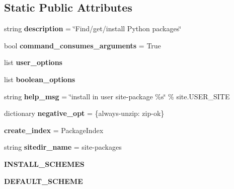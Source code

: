 \subsection*{Static Public Attributes}
\begin{DoxyCompactItemize}
\item 
\mbox{\label{classsetuptools_1_1command_1_1easy__install_1_1easy__install_a7413a87befc860cbf36d8b1bbd7270bc}} 
string {\bfseries description} = \char`\"{}Find/get/install Python packages\char`\"{}
\item 
\mbox{\label{classsetuptools_1_1command_1_1easy__install_1_1easy__install_a6c9ccc5d06b5291e3d6268b74fe33f14}} 
bool {\bfseries command\+\_\+consumes\+\_\+arguments} = True
\item 
\mbox{\label{classsetuptools_1_1command_1_1easy__install_1_1easy__install_a0b3f110c5afd8ba998ae1bcadf434b83}} 
list {\bfseries user\+\_\+options}
\item 
list {\bfseries boolean\+\_\+options}
\item 
\mbox{\label{classsetuptools_1_1command_1_1easy__install_1_1easy__install_a9d63d6cb0c65c3f27b636f28d4a678af}} 
string {\bfseries help\+\_\+msg} = \char`\"{}install in user site-\/package \textquotesingle{}\%s\textquotesingle{}\char`\"{} \% site.\+U\+S\+E\+R\+\_\+\+S\+I\+TE
\item 
\mbox{\label{classsetuptools_1_1command_1_1easy__install_1_1easy__install_a6ffaccc1356c1fc7c8d716599cd65d58}} 
dictionary {\bfseries negative\+\_\+opt} = \{\textquotesingle{}always-\/unzip\textquotesingle{}\+: \textquotesingle{}zip-\/ok\textquotesingle{}\}
\item 
\mbox{\label{classsetuptools_1_1command_1_1easy__install_1_1easy__install_a0fa9610fc4bff94a9847b570edc6b825}} 
{\bfseries create\+\_\+index} = Package\+Index
\item 
\mbox{\label{classsetuptools_1_1command_1_1easy__install_1_1easy__install_ad0aad4971daafa81175615c3d93d42d8}} 
string {\bfseries sitedir\+\_\+name} = \textquotesingle{}site-\/packages\textquotesingle{}
\item 
{\bfseries I\+N\+S\+T\+A\+L\+L\+\_\+\+S\+C\+H\+E\+M\+ES}
\item 
{\bfseries D\+E\+F\+A\+U\+L\+T\+\_\+\+S\+C\+H\+E\+ME}
\end{DoxyCompactItemize}


